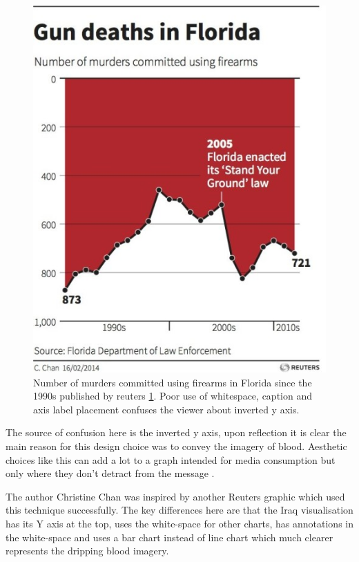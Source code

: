 \documentclass[a4paper,10pt, twocolumn]{article}
\begin{document}
\begin{figure}[htbp]
	\includegraphics[width=\linewidth]{floridagun.jpg}
	\centering
	\caption{Number of murders committed using firearms in Florida since the 1990s published by reuters \ref{fig:floridagun}. Poor use of whitespace, caption and axis label placement confuses the viewer about inverted y axis.}
	\label{fig:floridagun}
\end{figure}

The source of confusion here is the inverted y axis, upon reflection it is clear the main reason for this design choice was to convey the imagery of blood. Aesthetic choices like this can add a lot to a graph intended for media consumption but only where they don't detract from the message \cite{sexy}.

The author Christine Chan was inspired by another Reuters graphic which used this technique successfully\cite{iraqdeaths}. The key differences here are that the Iraq visualisation has its Y axis at the top, uses the white-space for other charts, has annotations in the white-space and uses a bar chart instead of line chart which much clearer represents the dripping blood imagery. 
\end{document}
